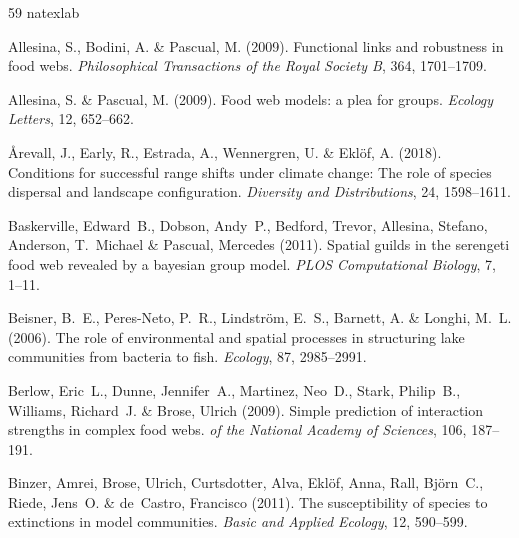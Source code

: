 \documentclass[11pt]{article}
\begin{document}
\begin{thebibliography}{59}
\expandafter\ifx\csname natexlab\endcsname\relax\def\natexlab#1{#1}\fi

Allesina, S., Bodini, A. \& Pascual, M. (2009).
\newblock Functional links and robustness in food webs.
\newblock \emph{Philosophical Transactions of the Royal Society B}, 364,
  1701--1709.

Allesina, S. \& Pascual, M. (2009).
\newblock Food web models: a plea for groups.
\newblock \emph{Ecology Letters}, 12, 652--662.

{\AA}revall, J., Early, R., Estrada, A., Wennergren, U. \& Ekl{\"o}f, A.
  (2018).
\newblock Conditions for successful range shifts under climate change: The role
  of species dispersal and landscape configuration.
\newblock \emph{Diversity and Distributions}, 24, 1598--1611.

Baskerville, Edward~B., Dobson, Andy~P., Bedford, Trevor, Allesina, Stefano,
  Anderson, T.~Michael \& Pascual, Mercedes (2011).
\newblock Spatial guilds in the serengeti food web revealed by a bayesian group
  model.
\newblock \emph{PLOS Computational Biology}, 7, 1--11.

Beisner, B.~E., Peres-Neto, P.~R., Lindstr{\"o}m, E.~S., Barnett, A. \& Longhi,
  M.~L. (2006).
\newblock The role of environmental and spatial processes in structuring lake
  communities from bacteria to fish.
\newblock \emph{Ecology}, 87, 2985--2991.

Berlow, Eric~L., Dunne, Jennifer~A., Martinez, Neo~D., Stark, Philip~B.,
  Williams, Richard~J. \& Brose, Ulrich (2009).
\newblock Simple prediction of interaction strengths in complex food webs.
\newblock \emph{of the National Academy of Sciences}, 106, 187--191.

Binzer, Amrei, Brose, Ulrich, Curtsdotter, Alva, Eklöf, Anna, Rall, Björn~C.,
  Riede, Jens~O. \& de~Castro, Francisco (2011).
\newblock The susceptibility of species to extinctions in model communities.
\newblock \emph{Basic and Applied Ecology}, 12, 590--599.


\end{thebibliography}
\end{document}
